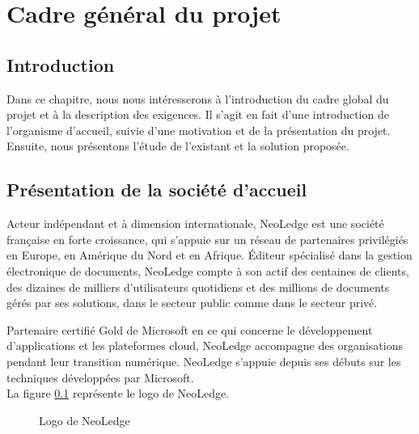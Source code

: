 
\chapter*{Cadre général du projet}
\label{chap:cadreGeneral}
\setcounter{part}{0}
\setcounter{chapter}{0}
\setcounter{section}{0}
\renewcommand{\thechapter}{\arabic{chapter}}
\renewcommand{\thepart}{\arabic{part}}
\renewcommand{\thesection}{\arabic{section}}

\section*{Introduction}
Dans ce chapitre, nous nous intéresserons à l'introduction du cadre global du projet et à la description des exigences. Il s'agit en fait d'une introduction de l'organisme d'accueil, suivie d'une motivation et de la présentation du projet. Ensuite, nous présentons l'étude de l'existant et la solution proposée. 

\section{Présentation de la société d'accueil}
Acteur indépendant et à dimension internationale, NeoLedge est une société française en forte croissance, qui s'appuie sur un réseau de partenaires privilégiés en Europe, en Amérique du Nord et en Afrique.
\medskip
Éditeur spécialisé dans la gestion électronique de documents, NeoLedge compte à son actif des centaines de clients, des dizaines de milliers d'utilisateurs quotidiens et des millions de documents gérés par ses solutions, dans le secteur public comme dans le secteur privé.

\medskip

Partenaire certifié Gold de Microsoft en ce qui concerne le développement d'applications et les plateformes cloud, NeoLedge accompagne des organisations 
pendant leur transition numérique.
NeoLedge s'appuie depuis ses débuts sur les techniques développées par Microsoft. \\

La figure \ref{fig:logoNeoledge} représente le logo de NeoLedge.\\
\begin{figure}[!h]
\centering
{}
\caption{Logo de NeoLedge}
\label{fig:logoNeoledge}
\end{figure}

